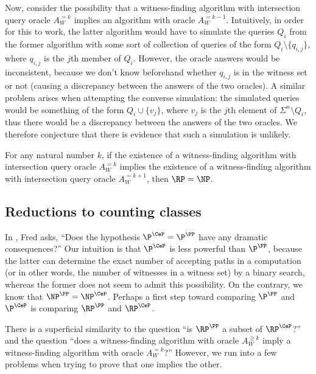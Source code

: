 \documentclass{article}
\begin{document}
Now, consider the possibility that a witness-finding algorithm with intersection query oracle $A^{= k}_W$ implies an algorithm with oracle $A^{= k - 1}_W$.
Intuitively, in order for this to work, the latter algorithm would have to simulate the queries $Q_i$ from the former algorithm with some sort of collection of queries of the form $Q_i \setminus \{q_{i, j}\}$, where $q_{i, j}$ is the $j$th member of $Q_i$.
However, the oracle answers would be inconsistent, because we don't know beforehand whether $q_{i, j}$ is in the witness set or not (causing a discrepancy between the answers of the two oracles).
A similar problem arises when attempting the converse simulation: the simulated queries would be something of the form $Q_i \cup \{v_j\}$, where $v_j$ is the $j$th element of $\Sigma^n \setminus Q_i$, thus there would be a discrepancy between the answers of the two oracles.
We therefore conjecture that there is evidence that such a simulation is unlikely.

\begin{conjecture}
  For any natural number $k$, if the existence of a witness-finding algorithm with intersection query oracle $A^{= k}_W$ implies the existence of a witness-finding algorithm with intersection query oracle $A^{= k + 1}_W$, then $\RP = \NP$.
\end{conjecture}

\subsection{Reductions to counting classes}

In \autocite[Section~7]{green93}, Fred asks, ``Does the hypothesis $\P^{\CeP} = \P^\PP$ have any dramatic consequences?''
Our intuition is that $\P^{\CeP}$ is less powerful than $\P^\PP$, because the latter can determine the exact number of accepting paths in a computation (or in other words, the number of witnesses in a witness set) by a binary search, whereas the former does not seem to admit this possibility.
On the contrary, we know that $\NP^\PP = \NP^{\CeP}$.
Perhaps a first step toward comparing $\P^\PP$ and $\P^{\CeP}$ is comparing $\RP^\PP$ and $\RP^{\CeP}$.

There is a superficial similarity to the question ``is $\RP^\PP$ a subset of $\RP^{\CeP}$?'' and the question ``does a witness-finding algorithm with oracle $A^{\geq k}_W$ imply a witness-finding algorithm with oracle $A^{= k}_W$?''
However, we run into a few problems when trying to prove that one implies the other.
\end{document}
